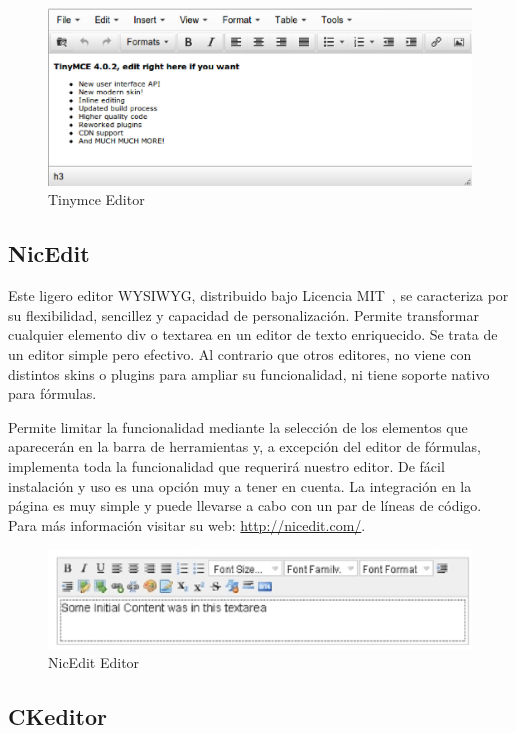 \begin{figure}[h!]
  \centering
      \includegraphics[width=1.0\textwidth]{fig/tmce1}
  \caption{Tinymce Editor}
\end{figure}

\subsection{NicEdit}

Este ligero editor WYSIWYG, distribuido bajo Licencia MIT~\cite{MITL:mitl}, se caracteriza por su flexibilidad, sencillez y capacidad de personalización. Permite transformar cualquier elemento div o textarea en un editor de texto enriquecido. Se trata de un editor simple pero efectivo. Al contrario que otros editores, no viene con distintos skins o plugins para ampliar su funcionalidad, ni tiene soporte nativo para fórmulas. 

Permite limitar la funcionalidad mediante la selección de los elementos que aparecerán en la barra de herramientas y, a excepción del editor de fórmulas, implementa toda la funcionalidad que requerirá nuestro editor. De fácil instalación y uso es una opción muy a tener en cuenta. La integración en la página es muy simple y puede llevarse a cabo con un par de líneas de código. Para más información visitar su web: \url{http://nicedit.com/}.


\begin{figure}[h!]
  \centering
      \includegraphics[width=1.0\textwidth]{fig/nice1}
  \caption{NicEdit Editor}
\end{figure}

\subsection{CKeditor}

